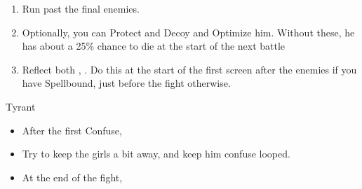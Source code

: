 \begin{gambit}
	\begin{itemize}
	\end{itemize}
\end{gambit}
\begin{enumerate}[resume]
\item Run past the final enemies.
\item Optionally, you can Protect and Decoy \vaan and Optimize him. Without these, he has about a 25\% chance to die at the start of the next battle
\item Reflect both \ashe, \penelo. Do this at the start of the first screen after the enemies if you have Spellbound, just before the fight otherwise.
\end{enumerate}
\begin{battle}{Tyrant}
	\begin{itemize}
		\penelof Dispel
		\vaanf Once it's charged a bit, start spamming Confuse
		\item After the first Confuse, \GirlsGambitOn
		\item Try to keep the girls a bit away, and keep him confuse looped.
		\item At the end of the fight, \GirlsGambitOff
	\end{itemize}
\end{battle}